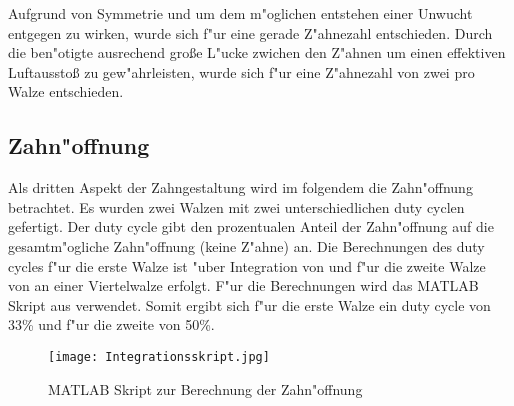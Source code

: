 Aufgrund von Symmetrie und um dem m"oglichen entstehen einer Unwucht entgegen zu wirken, wurde sich f"ur eine gerade Z"ahnezahl entschieden. Durch die ben"otigte ausrechend gro\ss{}e L"ucke zwichen den Z"ahnen um einen effektiven Luftaussto\ss{} zu gew"ahrleisten, wurde sich f"ur eine Z"ahnezahl von zwei pro Walze entschieden.\\

\subsection{Zahn"offnung}
Als dritten Aspekt der Zahngestaltung wird im folgendem die Zahn"offnung betrachtet. Es wurden zwei Walzen mit zwei unterschiedlichen duty cyclen gefertigt. Der duty cycle gibt den prozentualen Anteil der Zahn"offnung auf die gesamtm"ogliche Zahn"offnung (keine Z"ahne) an. Die Berechnungen des duty cycles f"ur die erste Walze ist "uber Integration von  und f"ur die zweite Walze von  an einer Viertelwalze erfolgt. F"ur die Berechnungen wird das MATLAB Skript aus  verwendet. Somit ergibt sich f"ur die erste Walze ein duty cycle von 33\% und f"ur die zweite von 50\%.
\begin{figure}[h]
	\centering
	\texttt{[image: Integrationsskript.jpg]}
	\caption{MATLAB Skript zur Berechnung der Zahn"offnung}
	\label{fig:Integrationsskript}
\end{figure}\\

